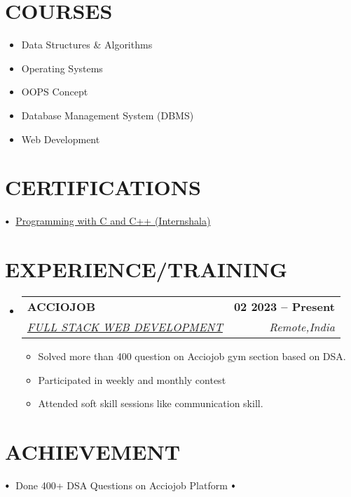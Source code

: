 \documentclass[a4paper,10pt]{article}
\makeatletter
\newcommand{\resumeItem}[1]{
  \item\small{
    {#1 \vspace{-2pt}}
  }
}
\newcommand{\resumeSubheading}[4]{
  \vspace{-2pt}\item
    \begin{tabular*}{1.0\textwidth}[t]{l@{\extracolsep{\fill}}r}
      \textbf{\large#1} & \textbf{\small #2} \\
      \textit{\large#3} & \textit{\small #4} \\
      
    \end{tabular*}\vspace{-7pt}
}
\newcommand{\resumeSubHeadingListStart}{\begin{itemize}[leftmargin=0.0in, label={}]}
\newcommand{\resumeSubHeadingListEnd}{\end{itemize}}
\newcommand{\resumeItemListStart}{\begin{itemize}}
\newcommand{\resumeItemListEnd}{\end{itemize}\vspace{-5pt}}
\newcommand\sbullet[1][.5]{\mathbin{\vcenter{\hbox{\scalebox{#1}{$\bullet$}}}}}
\makeatother
\begin{document}

\section{COURSES}
        \begin{multicols}{4}
            \begin{itemize}[itemsep=-2pt, parsep=5pt]
                \item Data Structures \& Algorithms
                \item Operating Systems
                \item OOPS Concept
                \item Database Management System (DBMS)
                \item Web Development
                
                
                
            \end{itemize}
        \end{multicols}
        \vspace*{1\multicolsep}





 
\section{CERTIFICATIONS}

$\sbullet[.75] \hspace{0.1cm}$ {\href{https://drive.google.com/file/d/1uG4vKN07GJGOkk2s1YCNKbmxaJfMmWXB/view?usp=drive_link}{Programming with C and C++ (Internshala)}} \hspace{1.6cm}

\section{EXPERIENCE/TRAINING}
  \resumeSubHeadingListStart
\resumeSubheading
      {ACCIOJOB}{02 2023 -- Present} 
      {\underline{FULL STACK WEB DEVELOPMENT}}{Remote,India}
      \resumeItemListStart
        \resumeItem{\normalsize{Solved more than 400 question on Acciojob gym section based on DSA.}}
   \resumeItem{\normalsize{ Participated in weekly and monthly contest}}
    \resumeItem{\normalsize{Attended soft skill sessions like communication skill.}}
    
  
      \resumeItemListEnd  
  \resumeSubHeadingListEnd
\vspace{-12pt}


\section{ACHIEVEMENT}

$\sbullet[.75] \hspace{0.1cm}$ {{Done 400+ DSA Questions on Acciojob Platform}} \hspace{1.6cm}
$\sbullet[.75] \hspace{0.1cm}$
\end{document}
